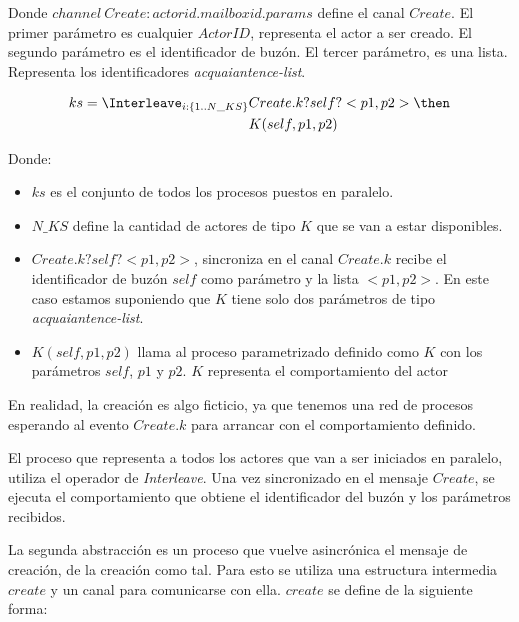 Donde $channel\ Create:actorid.mailboxid.params$ define el canal $Create$. El primer parámetro es cualquier $ActorID$, representa el actor a ser creado. El segundo parámetro es el identificador de buzón. El tercer parámetro, es una lista. Representa los identificadores \textit{acquaiantence-list}. 

\begin{align*}
ks = \Interleave_{i: \{1 .. N\_KS\}} & Create.k?self?<p1, p2> \then \\
& K(self, p1, p2) 
\end{align*}

Donde:

\begin{itemize}
 \item $ks$ es el conjunto de todos los procesos puestos en paralelo.
 \item $N\_KS$ define la cantidad de actores de tipo $K$ que se van a estar disponibles.
 \item $Create.k?self?<p1, p2>$, sincroniza en el canal $Create.k$ recibe el identificador de buzón $self$ como parámetro y la lista  $<p1, p2>$. En este caso estamos suponiendo que $K$ tiene solo dos parámetros de tipo \textit{acquaiantence-list}.
 \item $K(self, p1, p2)$ llama al proceso parametrizado definido como $K$ con los parámetros $self$, $p1$ y $p2$. $K$ representa el comportamiento del actor
\end{itemize}

En realidad, la creación es algo ficticio, ya que tenemos una red de procesos \CSP esperando al evento $Create.k$ para arrancar con el comportamiento definido. 


El proceso que representa a todos los actores que van a ser iniciados en paralelo, utiliza el operador de \textit{Interleave}. Una vez sincronizado en el mensaje $Create$, se ejecuta el comportamiento que obtiene el identificador del buzón y los parámetros recibidos. 

La segunda abstracción es un proceso que vuelve asincrónica el mensaje de creación, de la creación como tal. Para esto se utiliza una estructura intermedia $create$ y un canal para comunicarse con ella. $create$ se define de la siguiente forma: 


